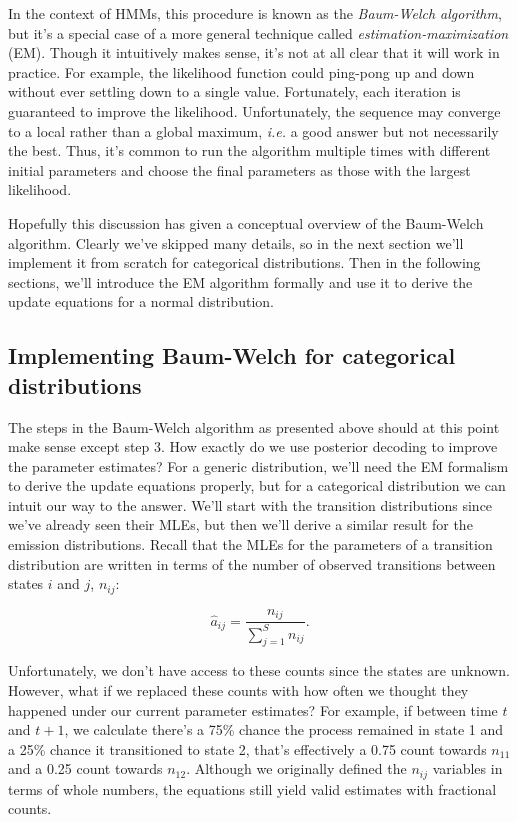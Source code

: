 In the context of HMMs, this procedure is known as the \textit{Baum-Welch algorithm}, but it's a special case of a more general technique called \textit{estimation-maximization} (EM). Though it intuitively makes sense, it's not at all clear that it will work in practice. For example, the likelihood function could ping-pong up and down without ever settling down to a single value. Fortunately, each iteration is guaranteed to improve the likelihood. Unfortunately, the sequence may converge to a local rather than a global maximum, \textit{i.e.} a good answer but not necessarily the best. Thus, it's common to run the algorithm multiple times with different initial parameters and choose the final parameters as those with the largest likelihood.

Hopefully this discussion has given a conceptual overview of the Baum-Welch algorithm. Clearly we've skipped many details, so in the next section we'll implement it from scratch for categorical distributions. Then in the following sections, we'll introduce the EM algorithm formally and use it to derive the update equations for a normal distribution.

\subsection{Implementing Baum-Welch for categorical distributions}

The steps in the Baum-Welch algorithm as presented above should at this point make sense except step 3. How exactly do we use posterior decoding to improve the parameter estimates? For a generic distribution, we'll need the EM formalism to derive the update equations properly, but for a categorical distribution we can intuit our way to the answer. We'll start with the transition distributions since we've already seen their MLEs, but then we'll derive a similar result for the emission distributions. Recall that the MLEs for the parameters of a transition distribution are written in terms of the number of observed transitions between states $i$ and $j$, $n_{ij}$:

\begin{equation*}
\hat{a}_{ij} = \frac{n_{ij}}{\sum_{j=1}^S n_{ij}}.
\end{equation*}

Unfortunately, we don't have access to these counts since the states are unknown. However, what if we replaced these counts with how often we thought they happened under our current parameter estimates? For example, if between time $t$ and $t+1$, we calculate there's a 75\% chance the process remained in state 1 and a 25\% chance it transitioned to state 2, that's effectively a 0.75 count towards $n_{11}$ and a 0.25 count towards $n_{12}$. Although we originally defined the $n_{ij}$ variables in terms of whole numbers, the equations still yield valid estimates with fractional counts.

